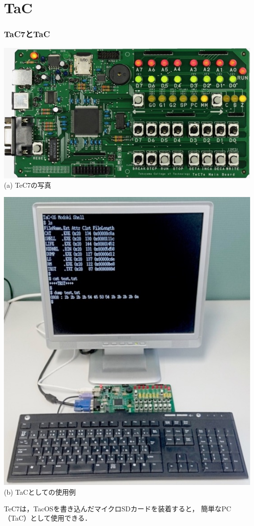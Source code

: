 \documentclass[dvipdfmx]{beamer}
\begin{document}
\section{TaC}
\begin{frame}
  \frametitle{TaC7とTaC}
  \begin{minipage}{0.58\columnwidth}
    \begin{center}
      \includegraphics[scale=0.27]{Photo/TeC7.jpg}\\
      (a) TeC7の写真
    \end{center}
  \end{minipage}
  \begin{minipage}{0.38\columnwidth}
    \begin{center}
      \includegraphics[scale=0.22]{Photo/TaC.jpg}\\
      (b) TaCとしての使用例
    \end{center}
  \end{minipage}
\vfill
TeC7は，TacOSを書き込んだマイクロSDカードを装着すると，
簡単なPC（TaC）として使用できる．
\end{frame}
\end{document}
